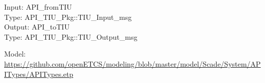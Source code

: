 \documentclass{template/openetcs_report}
\begin{document}
Input: API\_fromTIU\\
Type: API\_TIU\_Pkg::TIU\_Input\_msg\\

Output: API\_toTIU\\
Type: API\_TIU\_Pkg::TIU\_Output\_msg

Model: \url{https://github.com/openETCS/modeling/blob/master/model/Scade/System/APITypes/APITypes.etp}





\newpage
{}
\printindex
\end{document}
